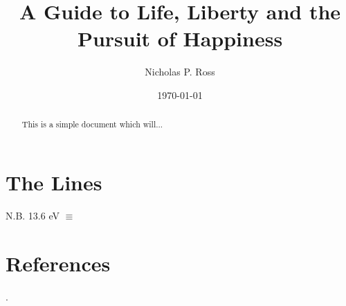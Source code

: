 \documentclass[11pt]{article}
\begin{document}
\title{A Guide to Life, Liberty and the Pursuit of Happiness}
\author{Nicholas P. Ross}
\date{\today}
\maketitle


\begin{abstract}
This is a simple document which will... 
\end{abstract}


\section{The Lines}
\citet{Croom04}
\noindent
N.B. 13.6 eV $\equiv$




\section{References}
\citet{Goulding12}. 



\end{document}
